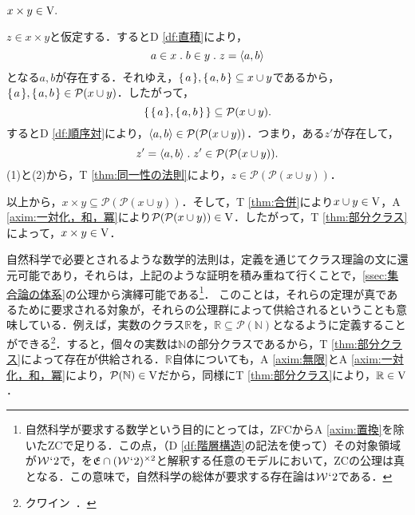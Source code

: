 \begin{thm}[直積]
\label{thm:直積}
$
    x\times y\in\mathrm{V}.
$
\end{thm}
\setcounter{equation}{0}
\begin{pf}
    $ z\in x\times y $と仮定する．するとD \ref{df:直積}により，
    \begin{equation}
        a\in x\con{1}b\in y\con{1}z = \orp{a,b}
    \end{equation}
    となる$a,b$が存在する．それゆえ，$ \{\mspace{2mu}a\mspace{2mu}\},\{\mspace{2mu}a,b\mspace{2mu}\}\subseteq x\cup y $であるから，$ \{\mspace{2mu}a\mspace{2mu}\},\{\mspace{2mu}a,b\mspace{2mu}\}\in\mathcal{P}(x\cup y)$．したがって，
    \[
        \{\mspace{2mu}\{\mspace{2mu}a\mspace{2mu}\},\{\mspace{2mu}a,b\mspace{2mu}\}\mspace{2mu}\}\subseteq\mathcal{P}(x\cup y).
    \]
    するとD \ref{df:順序対}により，$ \langle a,b \rangle\in\mathcal{P}(\mathcal{P}(x\cup y)) $．つまり，ある$ z' $が存在して，
    \begin{equation}
        z'=\orp{a,b}\con{1}z'\in \mathcal{P}(\mathcal{P}(x\cup y)).
    \end{equation}
    (1)と(2)から，T \ref{thm:同一性の法則}により，$ z\in\mathcal{P}(\mathcal{P}(x\cup y)) $．

    以上から，$ x\times y\subseteq \mathcal{P}(\mathcal{P}(x\cup y)) $．そして，T \ref{thm:合併}により$x\cup y\in\mathrm{V}$，A \ref{axim:一対化，和，冪}により$\mathcal{P}(\mathcal{P}(x\cup y))\in\mathrm{V}$．したがって，T \ref{thm:部分クラス}によって，$x\times y\in\mathrm{V}$．
\end{pf}

自然科学で必要とされるような数学的法則は，定義を通じてクラス理論の文に還元可能であり，それらは，上記のような証明を積み重ねて行くことで，\ref{ssec:集合論の体系}の公理から演繹可能である\footnote{
    自然科学が要求する数学という目的にとっては，ZFCからA \ref{axim:置換}を除いたZCで足りる．この点，（D \ref{df:階層構造}の記法を使って）その対象領域が$\mathcal{W}{\mspace{1mu}{`}\mspace{1mu}} 2$で，\kagi{$ \in $}を$ \mathfrak{E}\cap(\mathcal{W}{\mspace{1mu}{`}\mspace{1mu}} 2)^{\times 2} $と解釈する任意のモデルにおいて，ZCの公理は真となる．この意味で，自然科学の総体が要求する存在論は$ \mathcal{W}{\mspace{1mu}{`}\mspace{1mu}} 2 $である．
}．
このことは，それらの定理が真であるために要求される対象が，それらの公理群によって供給されるということも意味している．例えば，実数のクラス$\mathbb{R}$を，$ \mathbb{R}\subseteq\mathcal{P}(\mathbb{N}) $となるように定義することができる\footnote{
    クワイン~\cite[pp.\,113--117]{クワインa}．
}．すると，個々の実数は$\mathbb{N}$の部分クラスであるから，T \ref{thm:部分クラス}によって存在が供給される．$\mathbb{R}$自体についても，A \ref{axim:無限}とA \ref{axim:一対化，和，冪}により，$ \mathcal{P}(\mathbb{N})\in\mathrm{V} $だから，同様にT \ref{thm:部分クラス}により，$ \mathbb{R}\in\mathrm{V} $．

